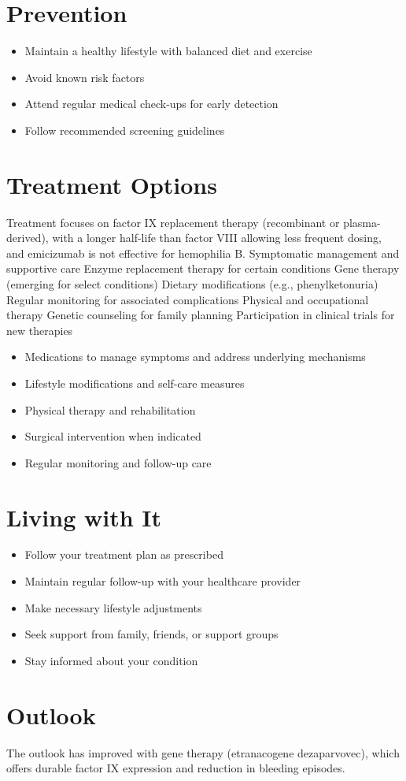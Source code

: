 \section{Prevention}
\begin{itemize}[noitemsep]
  \item Maintain a healthy lifestyle with balanced diet and exercise
  \item Avoid known risk factors
  \item Attend regular medical check-ups for early detection
  \item Follow recommended screening guidelines
\end{itemize}
\section{Treatment Options}
Treatment focuses on factor IX replacement therapy (recombinant or plasma-derived), with a longer half-life than factor VIII allowing less frequent dosing, and emicizumab is not effective for hemophilia B. Symptomatic management and supportive care Enzyme replacement therapy for certain conditions Gene therapy (emerging for select conditions) Dietary modifications (e.g., phenylketonuria) Regular monitoring for associated complications Physical and occupational therapy Genetic counseling for family planning Participation in clinical trials for new therapies

\begin{itemize}[noitemsep]
  \item Medications to manage symptoms and address underlying mechanisms
  \item Lifestyle modifications and self-care measures
  \item Physical therapy and rehabilitation
  \item Surgical intervention when indicated
  \item Regular monitoring and follow-up care
\end{itemize}
\section{Living with It}
\begin{itemize}[noitemsep]
  \item Follow your treatment plan as prescribed
  \item Maintain regular follow-up with your healthcare provider
  \item Make necessary lifestyle adjustments
  \item Seek support from family, friends, or support groups
  \item Stay informed about your condition
\end{itemize}
\section{Outlook}
The outlook has improved with gene therapy (etranacogene dezaparvovec), which offers durable factor IX expression and reduction in bleeding episodes.

